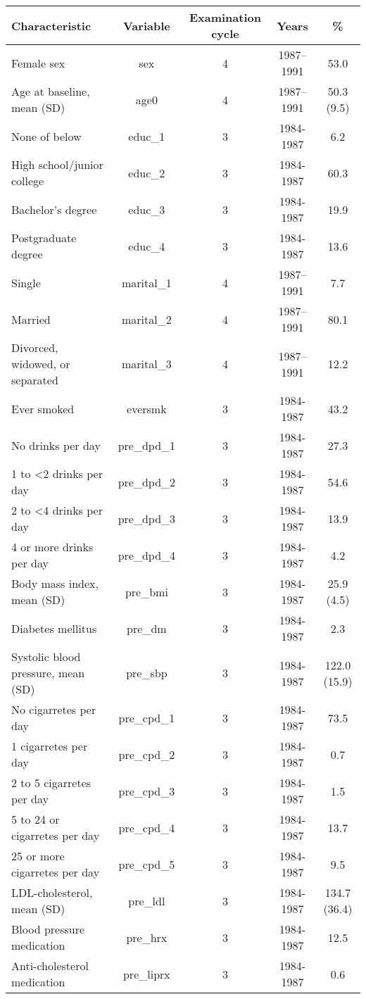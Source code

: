 
\begin{tabular}{lcccc}
\toprule
Characteristic & Variable & Examination cycle & Years & \%\\
\midrule
Female sex & sex & 4 & 1987–1991 & 53.0\\
Age at baseline, mean (SD) & age0 & 4 & 1987–1991 & 50.3 (9.5)\\
None of below & educ\_1 & 3 & 1984-1987 & 6.2\\
High school/junior college & educ\_2 & 3 & 1984-1987 & 60.3\\
Bachelor's degree & educ\_3 & 3 & 1984-1987 & 19.9\\
Postgraduate degree & educ\_4 & 3 & 1984-1987 & 13.6\\
Single & marital\_1 & 4 & 1987–1991 & 7.7\\
Married & marital\_2 & 4 & 1987–1991 & 80.1\\
Divorced, widowed, or separated & marital\_3 & 4 & 1987–1991 & 12.2\\
Ever smoked & eversmk & 3 & 1984-1987 & 43.2\\
No drinks per day & pre\_dpd\_1 & 3 & 1984-1987 & 27.3\\
1 to <2 drinks per day & pre\_dpd\_2 & 3 & 1984-1987 & 54.6\\
2 to <4 drinks per day & pre\_dpd\_3 & 3 & 1984-1987 & 13.9\\
4 or more drinks per day & pre\_dpd\_4 & 3 & 1984-1987 & 4.2\\
Body mass index, mean (SD) & pre\_bmi & 3 & 1984-1987 & 25.9 (4.5)\\
Diabetes mellitus & pre\_dm & 3 & 1984-1987 & 2.3\\
Systolic blood pressure, mean (SD) & pre\_sbp & 3 & 1984-1987 & 122.0 (15.9)\\
No cigarretes per day & pre\_cpd\_1 & 3 & 1984-1987 & 73.5\\
1 cigarretes per day & pre\_cpd\_2 & 3 & 1984-1987 & 0.7\\
2 to 5 cigarretes per day & pre\_cpd\_3 & 3 & 1984-1987 & 1.5\\
5 to 24 or cigarretes per day & pre\_cpd\_4 & 3 & 1984-1987 & 13.7\\
25 or more cigarretes per day & pre\_cpd\_5 & 3 & 1984-1987 & 9.5\\
LDL-cholesterol, mean (SD) & pre\_ldl & 3 & 1984-1987 & 134.7 (36.4)\\
Blood pressure medication & pre\_hrx & 3 & 1984-1987 & 12.5\\
Anti-cholesterol medication & pre\_liprx & 3 & 1984-1987 & 0.6\\
\bottomrule
\end{tabular}
